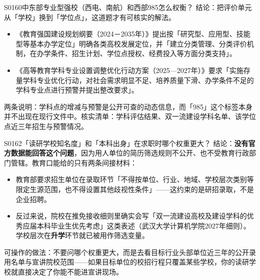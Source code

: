 \begin{qa}{S0160}{中东部专业型强校（西电、南航）和西部985怎么权衡？}
结论：把评价单元从「学校」换到「学位点」，这道题才有可核实的解法。

\begin{itemize}
  \item 《教育强国建设规划纲要（2024－2035年）》提出按「研究型、应用型、技能型等基本办学定位」明确各类高校发展定位，并「建立分类管理、分类评价机制，在办学条件、招生计划、学位点授权、经费投入等方面分类支持」。
  \item 《高等教育学科专业设置调整优化行动方案（2025—2027年）》要求「实施存量学科专业优化行动，对社会需求明显不足、培养质量下滑、办学条件不足的学科专业点进行预警并提出整改要求」。
\end{itemize}

两条说明：学科点的增减与预警是公开可查的动态信息，而「985」这个标签本身并不出现在现行文件中。核实清单：学科评估结果、双一流建设学科名单、该学位点近三年招生与预警情况。
\end{qa}

\begin{qa}{S0162}{「读研学校知名度」和「本科出身」在求职时哪个权重更大？}
结论：\textbf{没有官方数据能回答这个问题}，因为用人单位的简历筛选规则不公开、也不受教育行政部门管辖。教育口能给的只有两条间接材料：

\begin{itemize}
  \item 教育部要求招生单位在录取环节「不得按单位、行业、地域、学校层次类别等限定生源范围，也不得设置其他歧视性条件」——这约束的是研招录取，不是企业招聘。
  \item 反过来说，院校在推免接收细则里确实会写「双一流建设高校及建设学科的优秀应届本科毕业生优先考虑」这类表述（武汉大学计算机学院2027年细则）。学校层次在\textbf{升学}环节就已被用作筛选变量。
\end{itemize}

可操作的做法：不要问哪个权重更大，而是去看目标行业头部单位近三年的公开录用名单与宣讲院校范围——如果目标单位的校招行程只覆盖某些学校，你的读研学校就直接决定了你能不能进宣讲现场。
\end{qa}

